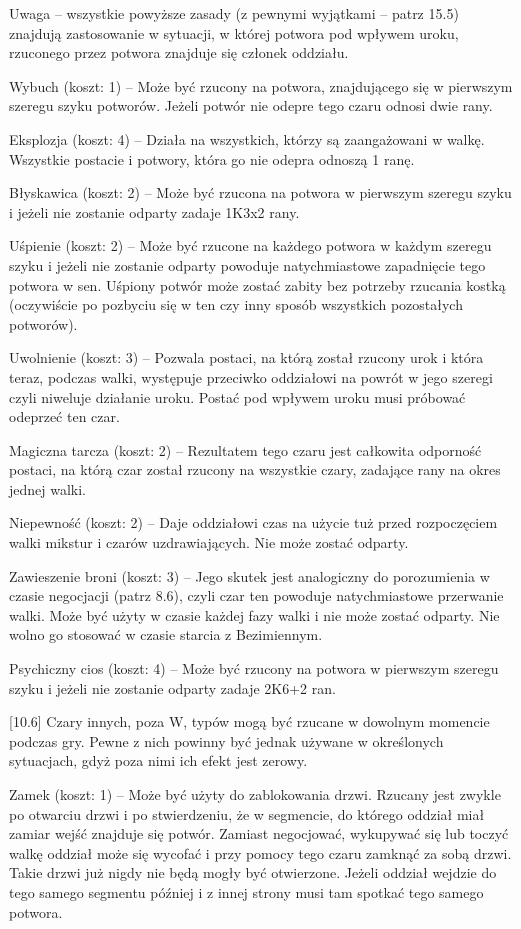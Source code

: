 Uwaga – wszystkie powyższe zasady (z pewnymi wyjątkami – patrz 15.5) znajdują zastosowanie w sytuacji, w której potwora pod wpływem uroku, rzuconego przez potwora znajduje się członek oddziału.

Wybuch (koszt: 1) – Może być rzucony na potwora, znajdującego się w pierwszym szeregu szyku potworów.
Jeżeli potwór nie odepre tego czaru odnosi dwie rany.

Eksplozja (koszt: 4) – Działa na wszystkich, którzy są zaangażowani w walkę.
Wszystkie postacie i potwory, która go nie odepra odnoszą 1 ranę.

Błyskawica (koszt: 2) – Może być rzucona na potwora w pierwszym szeregu szyku i jeżeli nie zostanie odparty zadaje 1K3x2 rany.

Uśpienie (koszt: 2) – Może być rzucone na każdego potwora w każdym szeregu szyku i jeżeli nie zostanie odparty powoduje natychmiastowe zapadnięcie tego potwora w sen.
Uśpiony potwór może zostać zabity bez potrzeby rzucania kostką (oczywiście po pozbyciu się w ten czy inny sposób wszystkich pozostałych potworów).

Uwolnienie (koszt: 3) – Pozwala postaci, na którą został rzucony urok i która teraz, podczas walki, występuje przeciwko oddziałowi na powrót w jego szeregi czyli niweluje działanie uroku.
Postać pod wpływem uroku musi próbować odeprzeć ten czar.

Magiczna tarcza (koszt: 2) – Rezultatem tego czaru jest całkowita odporność postaci, na którą czar został rzucony na wszystkie czary, zadające rany na okres jednej walki.

Niepewność (koszt: 2) – Daje oddziałowi czas na użycie tuż przed rozpoczęciem walki mikstur i czarów uzdrawiających.
Nie może zostać odparty.

Zawieszenie broni (koszt: 3) – Jego skutek jest analogiczny do porozumienia w czasie negocjacji (patrz 8.6), czyli czar ten powoduje natychmiastowe przerwanie walki.
Może być użyty w czasie każdej fazy walki i nie może zostać odparty.
Nie wolno go stosować w czasie starcia z Bezimiennym.

Psychiczny cios (koszt: 4) – Może być rzucony na potwora w pierwszym szeregu szyku i jeżeli nie zostanie odparty zadaje 2K6+2 ran.

[10.6] Czary innych, poza W, typów mogą być rzucane w dowolnym momencie podczas gry.
Pewne z nich powinny być jednak używane w określonych sytuacjach, gdyż poza nimi ich efekt jest zerowy.

Zamek (koszt: 1) – Może być użyty do zablokowania drzwi.
Rzucany jest zwykle po otwarciu drzwi i po stwierdzeniu, że w segmencie, do którego oddział miał zamiar wejść znajduje się potwór.
Zamiast negocjować, wykupywać się lub toczyć walkę oddział może się wycofać i przy pomocy tego czaru zamknąć za sobą drzwi.
Takie drzwi już nigdy nie będą mogły być otwierzone.
Jeżeli oddział wejdzie do tego samego segmentu później i z innej strony musi tam spotkać tego samego potwora.

